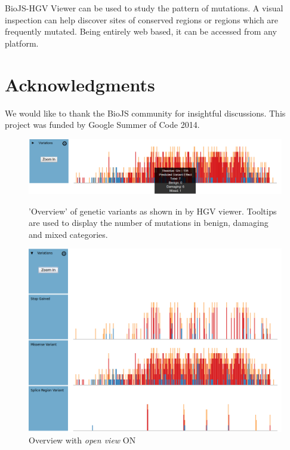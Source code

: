 \documentclass[twoside]{article}
\begin{document}
\begin{multicols}{2}
BioJS-HGV Viewer can be used to study the pattern of mutations. A visual inspection can help discover sites of conserved regions or regions which are frequently mutated. 
Being entirely web based, it can be accessed from any platform.




\section{Acknowledgments}
We would like to thank the BioJS community for insightful discussions. This project was funded by Google Summer of Code 2014.




\begin{figure}
\includegraphics[width=\linewidth]{images/overview_withtooltip}
\label{overviewtooltip}
\caption{'Overview' of genetic variants as shown in by HGV viewer. Tooltips are used to display the number of mutations in benign, damaging and mixed categories.}
\end{figure}
\begin{figure}

\includegraphics[width=\linewidth]{images/openview}
\caption{Overview with \textit{open view} ON}
\label{openview}
\end{figure}


\end{multicols}
\end{document}
